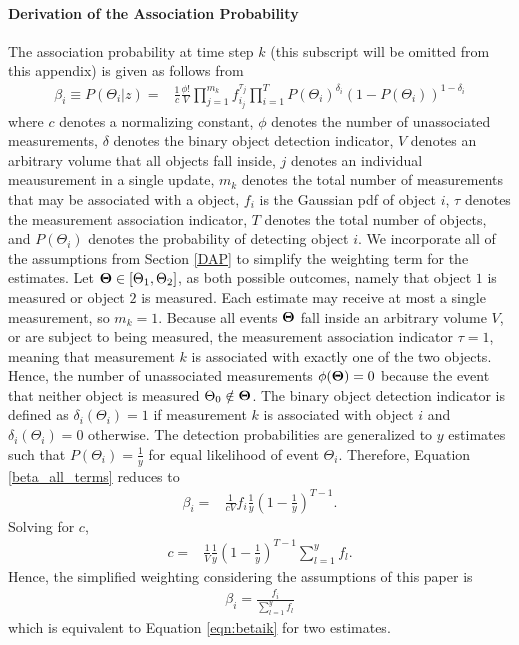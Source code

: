 \documentclass[letterpaper, 10pt, conference]{ieeeconf}
\begin{document}
\begin{appendix}
\label{append}

\paragraph{Derivation of the Association Probability}
The association probability at time step $k$ (this subscript will be omitted from this appendix) is given as follows from~\cite[Section 9.3]{TrackDataAssoc}
\begin{align}
\label{beta_all_terms}
\beta_i\equiv P(\Theta_i|z)=&\frac{1}{c}\frac{\phi!}{V}\displaystyle\prod_{j=1}^{m_k} f_{i_j}^{\tau_j}\displaystyle\prod_{i=1}^{T} P(\Theta_i)^{\delta_i}(1-P(\Theta_i))^{1-\delta_i}
\end{align}
where $c$ denotes a normalizing constant, $\phi$ denotes the number of unassociated measurements, $\delta$ denotes the binary object detection indicator, $V$ denotes an arbitrary volume that all objects fall inside, $j$ denotes an individual meausurement in a single update, $m_k$ denotes the total number of measurements that may be associated with a object, $f_{i}$ is the Gaussian pdf of object $i$, $\tau$ denotes the measurement association indicator, $T$ denotes the total number of objects, and $P(\Theta_i)$ denotes the probability of detecting object $i$.
We incorporate all of the assumptions from Section \ref{DAP} to simplify the weighting term for the estimates.
Let ${\bf{\Theta}}\in[\Theta_1, \Theta_2]$, as both possible outcomes, namely that object $1$ is measured or object $2$ is measured.
Each estimate may receive at most a single measurement, so $m_k=1$.
Because all events ${\bf{\Theta}}$ fall inside an arbitrary volume $V$, or are subject to being measured, the measurement association indicator $\tau=1$, meaning that measurement $k$ is associated with exactly one of the two objects.
Hence, the number of unassociated measurements $\phi({\bf{\Theta}})=0$ because the event that neither object is measured $\Theta_0\notin{\bf{\Theta}}$.
The binary object detection indicator is defined as $\delta_i(\Theta_i)=1$ if measurement $k$ is associated with object $i$ and $\delta_i(\Theta_i)=0$ otherwise.
The detection probabilities are generalized to $y$ estimates such that $P(\Theta_i)=\frac{1}{y}$ for equal likelihood of event $\Theta_i$.
Therefore, Equation \ref{beta_all_terms} reduces to
\begin{align}
\beta_i=&\frac{1}{cV}f_{i}\frac{1}{y}(1-\frac1y)^{T-1}.
\end{align}
Solving for $c$,
\begin{align}
c=&\frac{1}{V}\frac{1}{y}(1-\frac1y)^{T-1}\displaystyle\sum\limits_{l=1}^y f_{l}.
\end{align}
Hence, the simplified weighting considering the assumptions of this paper is
\begin{align}
\beta_i=\frac{f_i}{\displaystyle\sum\limits_{l=1}^y f_{l}}
\end{align}
which is equivalent to Equation \ref{eqn:betaik} for two estimates.



\end{appendix}
\end{document}
